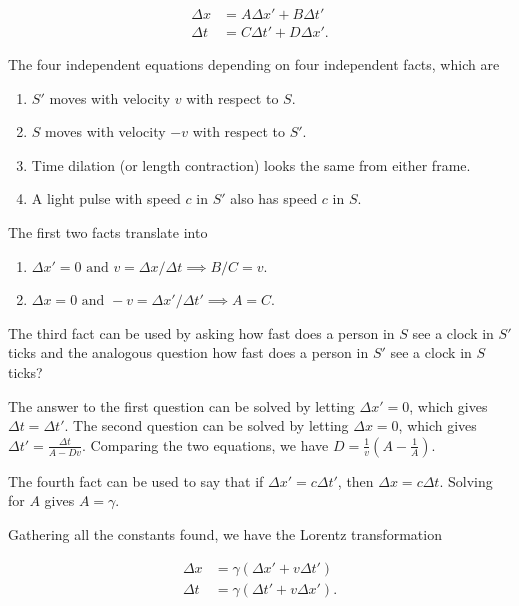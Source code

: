 \documentclass[english,a4paper,12pt]{report}
\begin{document}
\begin{equation}
    \begin{aligned}
        \Delta x &= A \Delta x' + B \Delta t' \\
        \Delta t &= C \Delta t' + D \Delta x'. 
    \end{aligned}
\end{equation}

The four independent equations depending on four independent facts, which are 

\begin{enumerate}
    \item \(S'\) moves with velocity \(v\) with respect to \(S\).
    \item \(S\)  moves with velocity \(-v\) with respect to \(S'\).
    \item Time dilation (or length contraction) looks the same from either frame.
    \item A light pulse with speed \(c\) in \(S'\) also has speed \(c\)  in \(S\).
\end{enumerate}

The first two facts translate into

\begin{enumerate}
    \item \( \Delta x' = 0 \text { and } v = \Delta x/\Delta t \implies B /C = v \).
    \item \( \Delta x = 0 \text { and } -v = \Delta x' /\Delta t'\implies A = C \).  
\end{enumerate}

The third fact can be used by asking how fast does a person in \(S\) see a clock in \(S'\) ticks and the analogous question how fast does a person in \(S'\) see a clock in \(S\) ticks? 

The answer to the first question can be solved by letting \(\Delta x' = 0\), which gives \(\Delta t = \Delta t'\). The second question can be solved by letting \(\Delta x = 0\), which gives \(\Delta t' = \frac{\Delta t}{A - Dv} \). Comparing the two equations, we have \(D = \frac{1}{v}(A - \frac{1}{A}) \). 

The fourth fact can be used to say that if \(\Delta x' = c \Delta t'\), then \(\Delta x = c \Delta t\). Solving for \(A\)  gives \(A = \gamma \). 

Gathering all the constants found, we have the Lorentz transformation

\begin{equation}
    \begin{aligned}
    \Delta x &= \gamma (\Delta x' + v \Delta t') \\
    \Delta t &= \gamma (\Delta t' + v \Delta x').
    \end{aligned}
\end{equation}
\end{document}
